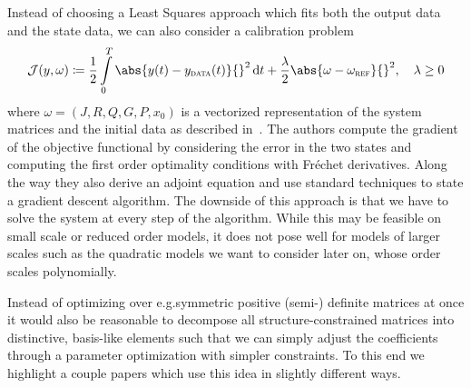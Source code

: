 
Instead of choosing a Least Squares approach which fits both the output data and the state data, we can also consider a calibration problem
\begin{equation}\label{eq:günther-calibration-objective}
    \mcl{J}(y, \omega) \coloneqq \frac{1}{2} \int\limits_0^T \abs{y(t) - y_\msc{data}(t)}{}^2 \dif t + \frac{\lambda}{2} \abs{\omega - \omega_\msc{ref}}{}^2, \quad \lambda \geq 0
\end{equation}
where $\omega = (J, R, Q, G, P, x_0)$ is a vectorized representation of the system matrices and the initial data as described in~\cite{Günther2023}.
The authors compute the gradient of the objective functional by considering the error in the two states and computing the first order optimality conditions with Fréchet derivatives.
Along the way they also derive an adjoint equation and use standard techniques to state a gradient descent algorithm.
The downside of this approach is that we have to solve the system at every step of the algorithm.
While this may be feasible on small scale or reduced order models, it does not pose well for models of larger scales such as the quadratic models we want to consider later on, whose order scales polynomially.


Instead of optimizing over e.\@ g.\@ symmetric positive (semi-) definite matrices at once it would also be reasonable to decompose all structure-constrained matrices into distinctive, basis-like elements such that we can simply adjust the coefficients through a parameter optimization with simpler constraints.
To this end we highlight a couple papers which use this idea in slightly different ways.

